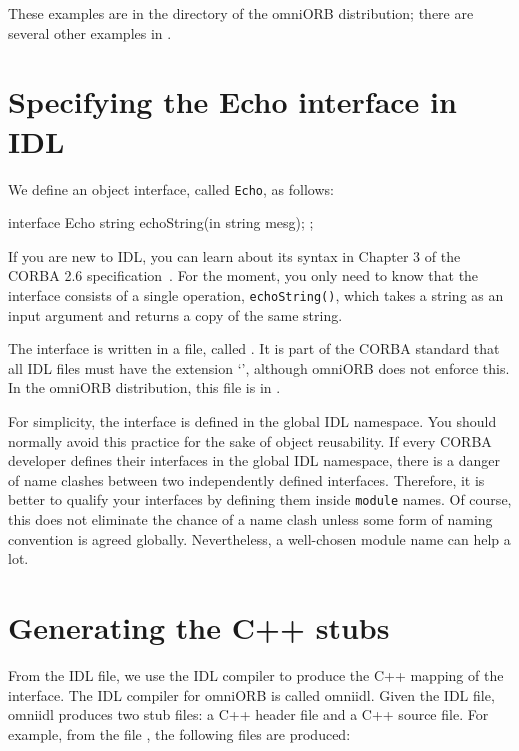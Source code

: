 \documentclass[11pt,oneside,a4paper]{book}
\newcommand{\intf}[1]{\texttt{#1}}
\newcommand{\code}[1]{\texttt{#1}}
\newcommand{\op}[1]{\texttt{#1()}}
\begin{document}
These examples are in the  directory of the
omniORB distribution; there are several other examples in
.


\section{Specifying the Echo interface in IDL}

We define an object interface, called \intf{Echo}, as follows:

\begin{idllisting}
interface Echo {
  string echoString(in string mesg);
};
\end{idllisting}

If you are new to IDL, you can learn about its syntax in Chapter 3 of
the CORBA 2.6 specification~\cite{corba26-spec}. For the moment, you
only need to know that the interface consists of a single operation,
\op{echoString}, which takes a string as an input argument and returns
a copy of the same string.

The interface is written in a file, called . It is part
of the CORBA standard that all IDL files must have the extension
`', although omniORB does not enforce this. In the omniORB
distribution, this file is in .

For simplicity, the interface is defined in the global IDL namespace.
You should normally avoid this practice for the sake of object
reusability.  If every CORBA developer defines their interfaces in the
global IDL namespace, there is a danger of name clashes between two
independently defined interfaces. Therefore, it is better to qualify
your interfaces by defining them inside \code{module} names. Of
course, this does not eliminate the chance of a name clash unless some
form of naming convention is agreed globally. Nevertheless, a
well-chosen module name can help a lot.


\section{Generating the C++ stubs}

From the IDL file, we use the IDL compiler to produce the C++ mapping
of the interface. The IDL compiler for omniORB is called omniidl.
Given the IDL file, omniidl produces two stub files: a C++ header file
and a C++ source file. For example, from the file , the
following files are produced:
\end{document}
